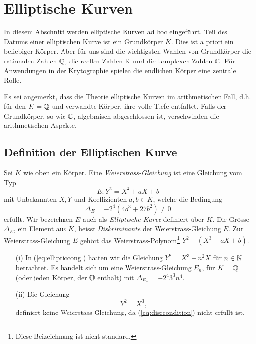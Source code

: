 \chapter{Elliptische Kurven}
\label{kap:ek}

In diesem Abschnitt werden elliptische Kurven ad hoc eingeführt.
Teil des Datums einer elliptischen Kurve ist ein Grundkörper $K$. Dies
ist a priori ein beliebiger Körper. Aber für uns sind die wichtigsten
Wahlen von Grundkörper die rationalen Zahlen ${\mathbb{Q}}$, die reellen Zahlen
${\mathbb{R}}$ und die komplexen Zahlen ${\mathbb{C}}$. Für Anwendungen in der
Krytographie spielen  die endlichen Körper eine zentrale Rolle.


Es sei angemerkt, dass die Theorie elliptische Kurven im
arithmetischen Fall, d.h. für den  $K={\mathbb{Q}}$ und verwandte Körper, ihre
volle Tiefe entfaltet. Falls der Grundkörper, so wie ${\mathbb{C}}$,
algebraisch abgeschlossen ist, verschwinden die arithmetischen
Aspekte.


\section{Definition der Elliptischen Kurve}

\begin{definition}
  Sei $K$ wie oben ein Körper.
  Eine \emph{Weierstrass-Gleichung} ist eine Gleichung vom Typ
  \begin{equation}
    \label{eq:weierstrass}
    E: Y^2 = X^3 + aX + b
  \end{equation}
  mit Unbekannten $X,Y$ und Koeffizienten $a,b\in K$, welche die
  Bedingung
  \begin{equation}
    \label{eq:disccondition}
    \Delta_E = -2^4(4a^3+27b^2)\not=0
  \end{equation}
  erfüllt. Wir bezeichnen $E$ auch als \emph{Elliptische
    Kurve}
  definiert über $K$.
  Die Grösse $\Delta_E$, ein Element aus $K$, heisst
  \emph{Diskriminante}
  der Weierstrass-Gleichung $E$. Zur Weierstrass-Gleichung $E$ gehört
  das Weierstrass-Polynom\footnote{Diese Beizeichnung ist nicht
    standard.} $Y^2- (X^3+aX+b)$.
\end{definition}

\begin{beispiele}\leavevmode
  \begin{enumerate}
  \item [(i)] In (\ref{eq:ellipticcong}) hatten wir die Gleichung $Y^2 = X^3-n^2X$
    für $n\in{\mathbb{N}}$ betrachtet. Es handelt sich um eine
    Weierstrass-Gleichung $E_n$, für $K={\mathbb{Q}}$ (oder jeden Körper, der ${\mathbb{Q}}$
    enthält) mit $\Delta_{E_n} = -2^4 3^3 n^4$.
  \item[(ii)] Die Gleichung
    \begin{equation*}
      Y^2 = X^3,
    \end{equation*}
    definiert keine Weierstass-Gleichung, da (\ref{eq:disccondition})
    nicht erfüllt ist.
  \end{enumerate}
\end{beispiele}

